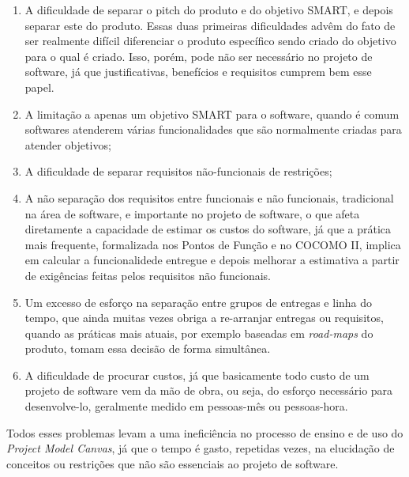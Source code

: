 \documentclass{article}
\begin{document}
\begin{enumerate}
    \item A dificuldade de separar o pitch do produto e do objetivo SMART, e depois separar este do produto. Essas duas primeiras dificuldades advêm do fato de ser realmente difícil diferenciar o produto específico sendo criado do objetivo para o qual é criado. Isso, porém, pode não ser necessário no projeto de software, já que justificativas, benefícios e requisitos cumprem bem esse papel.
    \item A limitação a apenas um objetivo SMART para o software, quando é comum softwares atenderem várias funcionalidades que são normalmente criadas para atender objetivos;
    \item A dificuldade de separar requisitos não-funcionais de restrições;
    \item A não separação dos requisitos entre funcionais e não funcionais, tradicional na área de software, e importante no projeto de software, o que afeta diretamente a capacidade de estimar os custos do software, já que a prática mais frequente, formalizada nos Pontos de Função\citep{ifpug:guide:2012} e no COCOMO II\citeauthor{cocomo2:manual}, implica em calcular a funcionalidede entregue e depois melhorar a estimativa a partir de exigências feitas pelos requisitos não funcionais.
    \item Um excesso de esforço na separação entre grupos de entregas e linha do tempo, que ainda muitas vezes obriga a re-arranjar entregas ou requisitos, quando as práticas mais atuais, por exemplo baseadas em \textit{road-maps} do produto, tomam essa decisão de forma simultânea.
    \item \label{problems:total} A dificuldade de procurar custos, já que basicamente todo custo de um projeto de software vem da mão de obra, ou seja, do esforço necessário para desenvolve-lo, geralmente medido em pessoas-mês ou pessoas-hora.
\end{enumerate}

Todos esses problemas levam a uma ineficiência no processo de ensino e de uso do \textit{Project Model Canvas}, já que o tempo é gasto, repetidas vezes, na elucidação de conceitos ou restrições que não são essenciais ao projeto de software.
\end{document}
